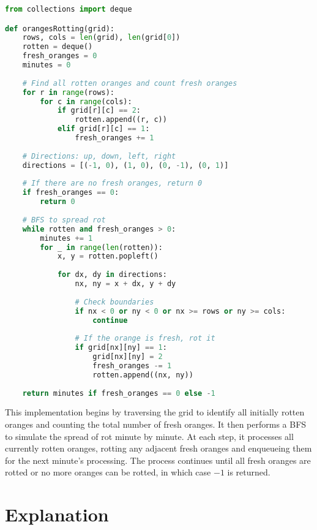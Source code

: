 \begin{fullwidth}
\begin{lstlisting}[language=Python]
from collections import deque

def orangesRotting(grid):
    rows, cols = len(grid), len(grid[0])
    rotten = deque()
    fresh_oranges = 0
    minutes = 0
    
    # Find all rotten oranges and count fresh oranges
    for r in range(rows):
        for c in range(cols):
            if grid[r][c] == 2:
                rotten.append((r, c))
            elif grid[r][c] == 1:
                fresh_oranges += 1
    
    # Directions: up, down, left, right
    directions = [(-1, 0), (1, 0), (0, -1), (0, 1)]
    
    # If there are no fresh oranges, return 0
    if fresh_oranges == 0:
        return 0
    
    # BFS to spread rot
    while rotten and fresh_oranges > 0:
        minutes += 1
        for _ in range(len(rotten)):
            x, y = rotten.popleft()
            
            for dx, dy in directions:
                nx, ny = x + dx, y + dy
                
                # Check boundaries
                if nx < 0 or ny < 0 or nx >= rows or ny >= cols:
                    continue
                
                # If the orange is fresh, rot it
                if grid[nx][ny] == 1:
                    grid[nx][ny] = 2
                    fresh_oranges -= 1
                    rotten.append((nx, ny))
    
    return minutes if fresh_oranges == 0 else -1
\end{lstlisting}
\end{fullwidth}

This implementation begins by traversing the grid to identify all initially rotten oranges and counting the total number of fresh oranges. It then performs a BFS to simulate the spread of rot minute by minute. At each step, it processes all currently rotten oranges, rotting any adjacent fresh oranges and enqueueing them for the next minute's processing. The process continues until all fresh oranges are rotted or no more oranges can be rotted, in which case \(-1\) is returned.

\section*{Explanation}

